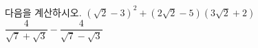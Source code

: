 다음을 계산하시오.
 $(\sqrt{2}-3)^2+(2\sqrt{2}-5)(3\sqrt{2}+2)$
 $\dfrac{4}{\sqrt{7}+\sqrt{3}}-\dfrac{4}{\sqrt{7}-\sqrt{3}}$
